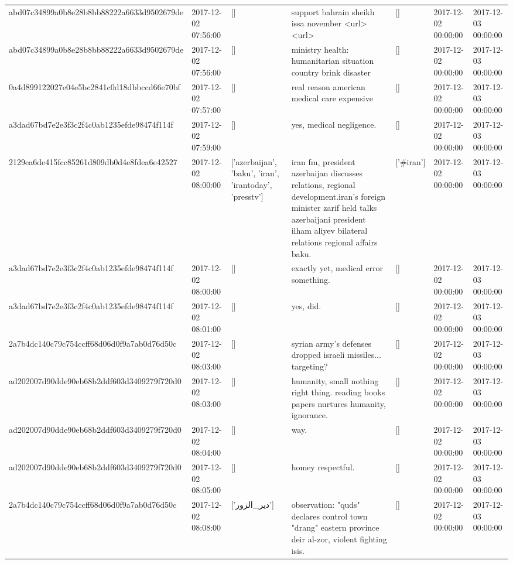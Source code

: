 \begin{tabular}{lllllll}
abd07c34899a0b8e28b8bb88222a6633d9502679de & 2017-12-02 07:56:00 & [] & support bahrain sheikh issa november <url> <url> & [] & 2017-12-02 00:00:00 & 2017-12-03 00:00:00 \\
abd07c34899a0b8e28b8bb88222a6633d9502679de & 2017-12-02 07:56:00 & [] & ministry health: humanitarian situation country brink disaster & [] & 2017-12-02 00:00:00 & 2017-12-03 00:00:00 \\
0a4d899122027e04e5bc2841c0d18dbbccd66e70bf & 2017-12-02 07:57:00 & [] & real reason american medical care expensive & [] & 2017-12-02 00:00:00 & 2017-12-03 00:00:00 \\
a3dad67bd7e2e3f3c2f4c0ab1235efde98474f114f & 2017-12-02 07:59:00 & [] & yes, medical negligence. & [] & 2017-12-02 00:00:00 & 2017-12-03 00:00:00 \\
2129ea6de415fcc85261d809db0d4e8fdea6e42527 & 2017-12-02 08:00:00 & ['azerbaijan', 'baku', 'iran', 'irantoday', 'presstv'] & iran fm, president azerbaijan discusses relations, regional development.iran's foreign minister zarif held talks azerbaijani president ilham aliyev bilateral relations regional affairs baku. & ['#iran'] & 2017-12-02 00:00:00 & 2017-12-03 00:00:00 \\
a3dad67bd7e2e3f3c2f4c0ab1235efde98474f114f & 2017-12-02 08:00:00 & [] & exactly yet, medical error something. & [] & 2017-12-02 00:00:00 & 2017-12-03 00:00:00 \\
a3dad67bd7e2e3f3c2f4c0ab1235efde98474f114f & 2017-12-02 08:01:00 & [] & yes, did. & [] & 2017-12-02 00:00:00 & 2017-12-03 00:00:00 \\
2a7b4dc140c79c754ccff68d06d0f9a7ab0d76d50c & 2017-12-02 08:03:00 & [] & syrian army's defenses dropped israeli missiles... targeting? & [] & 2017-12-02 00:00:00 & 2017-12-03 00:00:00 \\
ad202007d90dde90eb68b2ddf603d3409279f720d0 & 2017-12-02 08:03:00 & [] & humanity, small nothing right thing. reading books papers nurtures humanity, ignorance. & [] & 2017-12-02 00:00:00 & 2017-12-03 00:00:00 \\
ad202007d90dde90eb68b2ddf603d3409279f720d0 & 2017-12-02 08:04:00 & [] & way. & [] & 2017-12-02 00:00:00 & 2017-12-03 00:00:00 \\
ad202007d90dde90eb68b2ddf603d3409279f720d0 & 2017-12-02 08:05:00 & [] & homey respectful. & [] & 2017-12-02 00:00:00 & 2017-12-03 00:00:00 \\
2a7b4dc140c79c754ccff68d06d0f9a7ab0d76d50c & 2017-12-02 08:08:00 & ['دير_الزور'] & observation: "quds" declares control town "drang" eastern province deir al-zor, violent fighting isis. & [] & 2017-12-02 00:00:00 & 2017-12-03 00:00:00 \\

\end{tabular}
